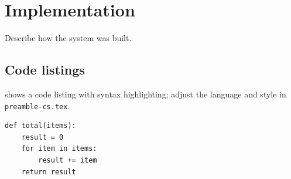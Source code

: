 \chapter{Implementation}
Describe how the system was built.

\section{Code listings}
 shows a code listing with syntax highlighting; adjust the language and style in \texttt{preamble-cs.tex}.

\begin{lstlisting}[caption={A sample code listing.},label={lst:sample}]
def total(items):
    result = 0
    for item in items:
        result += item
    return result
\end{lstlisting}
